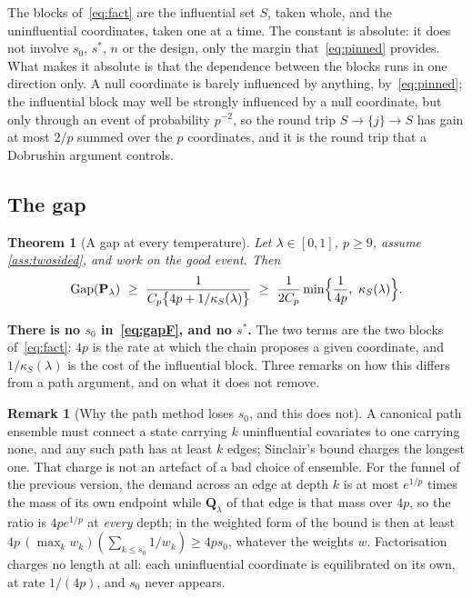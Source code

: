 \documentclass[aos]{imsart}
\theoremstyle{plain}
\newtheorem{theorem}{Theorem}[section]
\theoremstyle{definition}
\newtheorem{remark}{Remark}[section]
\begin{document}
    The blocks of~\eqref{eq:fact} are the influential set $S$, taken whole,
    and the uninfluential coordinates, taken one at a time. The constant is
    absolute: it does not involve $s_0$, $s^{\ast}$, $n$ or the design, only
    the margin that~\eqref{eq:pinned} provides. What makes it absolute is
    that the dependence between the blocks runs in one direction only. A
    null coordinate is barely influenced by anything, by~\eqref{eq:pinned};
    the influential block may well be strongly influenced by a null
    coordinate, but only through an event of probability $p^{-2}$, so the
    round trip $S\to\{j\}\to S$ has gain at most $2/p$ summed over the $p$
    coordinates, and it is the round trip that a Dobrushin argument
    controls.

    \subsection{The gap}
    \label{sub:gapF}

    \begin{theorem}[A gap at every temperature]
        \label{th:gapF}
        Let $\lambda\in[0,1]$, $p\geq9$, assume \cref{ass:twosided}, and
        work on the good event. Then
        \begin{equation}
            \label{eq:gapF}
            \mathrm{Gap}(\mathbf{P}_\lambda)\ \geq\
            \frac{1}{C_p\bigl\{4p+1/\kappa_S(\lambda)\bigr\}}
            \ \geq\ \frac{1}{2C_p}
            \min\Bigl\{\frac{1}{4p},\ \kappa_S(\lambda)\Bigr\} .
        \end{equation}
    \end{theorem}

    \textbf{There is no $s_0$ in~\eqref{eq:gapF}, and no $s^{\ast}$.} The
    two terms are the two blocks of~\eqref{eq:fact}: $4p$ is the rate at
    which the chain proposes a given coordinate, and $1/\kappa_S(\lambda)$
    is the cost of the influential block. Three remarks on how this differs
    from a path argument, and on what it does not remove.

    \begin{remark}[Why the path method loses $s_0$, and this does not]
        \label{rem:whys0}
        A canonical path ensemble must connect a state carrying $k$
        uninfluential covariates to one carrying none, and any such path has
        at least $k$ edges; Sinclair's bound charges the longest one. That
        charge is not an artefact of a bad choice of ensemble. For the
        funnel of the previous version, the demand across an edge at depth
        $k$ is at most $e^{1/p}$ times the mass of its own endpoint while
        $\mathbf{Q}_\lambda$ of that edge is that mass over $4p$, so the
        ratio is $4pe^{1/p}$ at \emph{every} depth; in the weighted form of
        \citet{DiaconisStroock1991} the bound is then at least
        $4p\,(\max_kw_k)(\sum_{k\leq s_0}1/w_k)\geq4ps_0$, whatever the
        weights $w$. Factorisation charges no length at all: each
        uninfluential coordinate is equilibrated on its own, at rate
        $1/(4p)$, and $s_0$ never appears.
    \end{remark}
\end{document}
